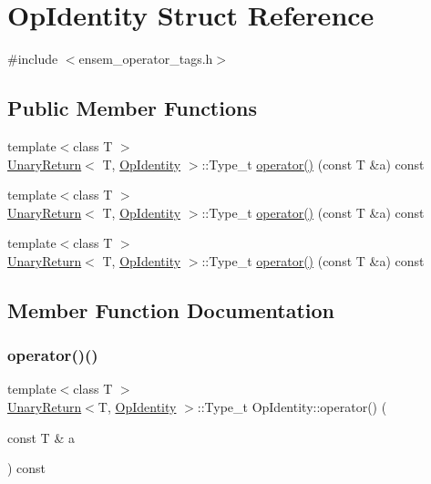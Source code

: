 \hypertarget{structOpIdentity}{}\section{Op\+Identity Struct Reference}
\label{structOpIdentity}


{\ttfamily \#include $<$ensem\+\_\+operator\+\_\+tags.\+h$>$}

\subsection*{Public Member Functions}
\begin{DoxyCompactItemize}
\item 
{\footnotesize template$<$class T $>$ }\\\mbox{\hyperlink{structUnaryReturn}{Unary\+Return}}$<$ T, \mbox{\hyperlink{structOpIdentity}{Op\+Identity}} $>$\+::Type\+\_\+t \mbox{\hyperlink{structOpIdentity_a1d482adc4d4bd1a7fee1616bb11c1f71}{operator()}} (const T \&a) const
\item 
{\footnotesize template$<$class T $>$ }\\\mbox{\hyperlink{structUnaryReturn}{Unary\+Return}}$<$ T, \mbox{\hyperlink{structOpIdentity}{Op\+Identity}} $>$\+::Type\+\_\+t \mbox{\hyperlink{structOpIdentity_a1d482adc4d4bd1a7fee1616bb11c1f71}{operator()}} (const T \&a) const
\item 
{\footnotesize template$<$class T $>$ }\\\mbox{\hyperlink{structUnaryReturn}{Unary\+Return}}$<$ T, \mbox{\hyperlink{structOpIdentity}{Op\+Identity}} $>$\+::Type\+\_\+t \mbox{\hyperlink{structOpIdentity_a1d482adc4d4bd1a7fee1616bb11c1f71}{operator()}} (const T \&a) const
\end{DoxyCompactItemize}


\subsection{Member Function Documentation}
\mbox{\label{structOpIdentity_a1d482adc4d4bd1a7fee1616bb11c1f71}} 
\subsubsection{\texorpdfstring{operator()()}{operator()()}\hspace{0.1cm}{\footnotesize\ttfamily [1/3]}}
{\footnotesize\ttfamily template$<$class T $>$ \\
\mbox{\hyperlink{structUnaryReturn}{Unary\+Return}}$<$T, \mbox{\hyperlink{structOpIdentity}{Op\+Identity}} $>$\+::Type\+\_\+t Op\+Identity\+::operator() (\begin{DoxyParamCaption}\item[{const T \&}]{a }\end{DoxyParamCaption}) const\hspace{0.3cm}{\ttfamily [inline]}}


